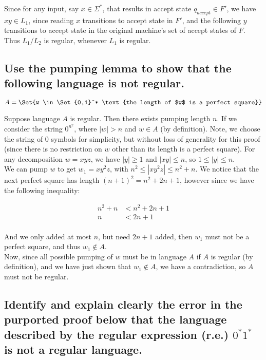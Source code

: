 \documentclass{article}
\providecommand\given{} %
\begin{document}
Since for any input, say $x \in \Sigma^*$, that results in accept state $q_{accept} \in F'$, we have $xy \in L_1$, since reading $x$ transitions to accept state in $F'$, and the following $y$ transitions to accept state in the original machine's set of accept states of $F$.  Thus $L_1/L_2$ is regular, whenever $L_1$ is regular.

\subsection{Use the pumping lemma to show that the following language is not regular.}

\begin{equation*}
	A = \Set{w \in \Set{0,1}^* \given \text{the length of $w$ is a perfect square}}
\end{equation*}

Suppose language $A$ is regular.  Then there exists pumping length $n$.  If we consider the string $0^{n^2}$, where $|w| > n$ and $w \in A$ (by definition).  Note, we choose the string of 0 symbols for simplicity, but without loss of generality for this proof (since there is no restriction on $w$ other than its length is a perfect square). For any decomposition $w = xyz$, we have $|y| \geq 1$ and $|xy| \leq n$, so $1 \leq |y| \leq n$.  \\

We can pump $w$ to get $w_1 = xy^2z$, with $n^2 \leq |xy^2z| \leq n^2 + n$.  We notice that the next perfect square has length $(n + 1)^2 = n^2 + 2n + 1$, however since we have the following inequality:

\begin{align*}
	n^2 + n & < n^2 + 2n + 1 \\
	n       & < 2n + 1       \\
\end{align*}

And we only added at most $n$, but need $2n + 1$ added, then $w_1$ must not be a perfect square, and thus $w_1 \not \in A$.  \\

Now, since all possible pumping of $w$ must be in language $A$ if $A$ is regular (by definition), and we have just shown that $w_1 \not \in A$, we have a contradiction, so $A$ must not be regular.

\subsection{Identify and explain clearly the error in the purported proof below that the language described by the regular expression (r.e.)  $0^*1^*$ is not a regular language.}
\end{document}
